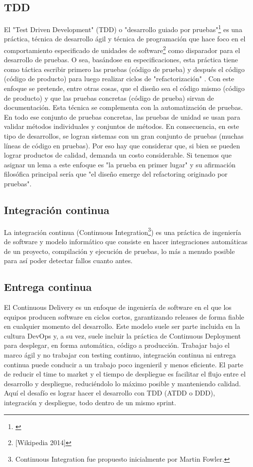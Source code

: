 \subsection{TDD}

El "Test Driven Development" (TDD) o "desarrollo guiado por pruebas"\footnote{\cite{Jurado-2010}} es una práctica, técnica de desarrollo ágil y técnica de programación que hace foco en el comportamiento especificado de unidades de software\footnote{[Wikipedia 2014]} como disparador para el desarrollo de pruebas. O sea, basándose en especificaciones, esta práctica tiene como táctica escribir primero las pruebas (código de prueba) y después el código (código de producto) para luego realizar ciclos de "refactorización" \cite{Kent-Beck-2003}. Con este enfoque se pretende, entre otras cosas, que el diseño sea el código mismo (código de producto) y que las pruebas concretas (código de prueba) sirvan de documentación. Esta técnica se complementa con la automatización de pruebas. En todo ese conjunto de pruebas concretas, las pruebas de unidad se usan para validar métodos individuales y conjuntos de métodos. En consecuencia, en este tipo de desarrollos, se logran sistemas con un gran conjunto de pruebas (muchas líneas de código en pruebas). Por eso hay que considerar que, si bien se pueden lograr productos de calidad, demanda un costo considerable.\newline
Si tenemos que asignar un lema a este enfoque es "la prueba en primer lugar" y su afirmación filosófica principal sería que "el diseño emerge del refactoring originado por pruebas".

\subsection{Integración continua}

La integración continua (Continuous Integration\footnote{Continuous Integration fue propuesto inicialmente por Martin Fowler.}) es una práctica de ingeniería de software y modelo informático que consiste en hacer integraciones automáticas de un proyecto, compilación y ejecución de pruebas, lo más a menudo posible para así poder detectar fallos cuanto antes.

\subsection{Entrega continua}

El Continuous Delivery es un enfoque de ingeniería de software en el que los equipos producen software en ciclos cortos, garantizando releases de forma fiable en cualquier momento del desarrollo. Este modelo suele ser parte incluida en la cultura DevOps y, a su vez, suele incluir la práctica de Continuous Deployment para desplegar, en forma automática, código a producción. Trabajar bajo el marco ágil y no trabajar con testing continuo, integración continua ni entrega continua puede conducir a un trabajo poco ingenieril y menos eficiente. El parte de reducir el time to market y el tiempo de despliegue es facilitar el flujo entre el desarrollo y despliegue, reduciéndolo lo máximo posible y manteniendo calidad. Aquí el desafío es lograr hacer el desarrollo con TDD (ATDD o DDD), integración y despliegue, todo dentro de un mismo sprint.

